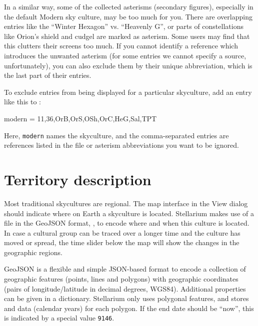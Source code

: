 In a similar way, some of the collected asterisms (secondary figures), especially in the default Modern sky culture, may be too much for you. 
There are overlapping entries like the ``Winter Hexagon'' vs. ``Heavenly G'', 
or parts of constellations like Orion's shield and cudgel are marked as asterism. Some users may find that this clutters their screens too much. 
If you cannot identify a reference which introduces the unwanted asterism (for some entries we cannot specify a source, unfortunately), 
you can also exclude them by their unique abbreviation, which is the last part of their  entries.

To exclude entries from being displayed for a particular skyculture, add an entry like this to :
\begin{configfile}
[SCExcludeReferences]
modern  = 11,36,OrB,OrS,OSh,OrC,HeG,Sal,TPT
\end{configfile}
%
Here, \texttt{modern} names the skyculture, and the comma-separated entries are references listed in 
the file  or asterism abbreviations you want to be ignored.


\section{Territory description}
\label{sec:skycultures:territory}
\label{SC:territory.geojson}

Most traditional skycultures are regional. The map interface in the View dialog should indicate where on Earth a skyculture is located. 
Stellarium makes use of a file in the GeoJSON format, , to encode where and when this culture is located. 
In case a cultural group can be traced over a longer time and the culture has moved or spread, the time slider below the map will show the changes in the geographic regions.  

GeoJSON is a flexible and simple JSON-based format to encode a collection of geographic features (points, lines and polygons) with geographic coordinates (pairs of longitude/latitude in decimal degrees, WGS84). 
Additional properties can be given in a  dictionary.  Stellarium only uses polygonal features, and stores  and  data (calendar years) for each polygon. 
If the end date should be ``now'', this is indicated by a special value \texttt{9146}.


